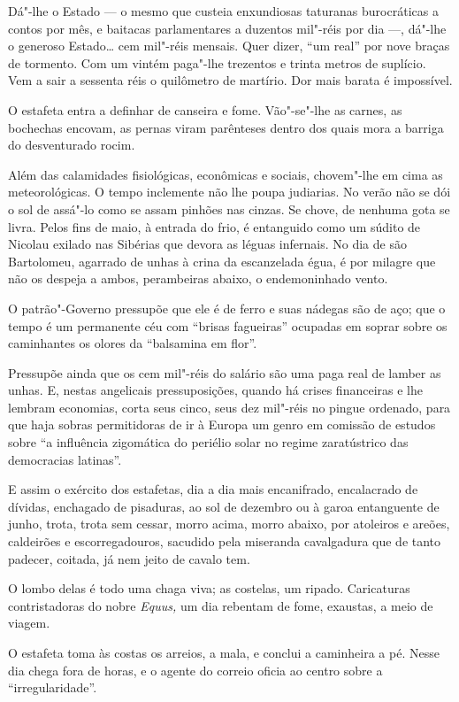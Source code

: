 Dá"-lhe o Estado --- o mesmo que custeia enxundiosas taturanas
burocráticas a contos por mês, e baitacas parlamentares a duzentos
mil"-réis por dia ---, dá"-lhe o generoso Estado\ldots{} cem mil"-réis mensais.
Quer dizer, ``um real'' por nove braças de tormento. Com um vintém
paga"-lhe trezentos e trinta metros de suplício. Vem a sair a sessenta
réis o quilômetro de martírio. Dor mais barata é impossível.

O estafeta entra a definhar de canseira e fome. Vão"-se"-lhe as carnes, as
bochechas encovam, as pernas viram parênteses dentro dos quais mora a
barriga do desventurado rocim.

Além das calamidades fisiológicas, econômicas e sociais, chovem"-lhe em
cima as meteorológicas. O tempo inclemente não lhe poupa judiarias. No
verão não se dói o sol de assá"-lo como se assam pinhões nas cinzas. Se
chove, de nenhuma gota se livra. Pelos fins de maio, à entrada do frio,
é entanguido como um súdito de Nicolau exilado nas Sibérias que devora
as léguas infernais. No dia de são Bartolomeu, agarrado de unhas à crina
da escanzelada égua, é por milagre que não os despeja a ambos,
perambeiras abaixo, o endemoninhado vento.

O patrão"-Governo pressupõe que ele é de ferro e suas nádegas são de aço;
que o tempo é um permanente céu com ``brisas fagueiras'' ocupadas em
soprar sobre os caminhantes os olores da ``balsamina em flor''.

Pressupõe ainda que os cem mil"-réis do salário são uma paga real de
lamber as unhas. E, nestas angelicais pressuposições, quando há crises
financeiras e lhe lembram economias, corta seus cinco, seus dez mil"-réis
no pingue ordenado, para que haja sobras permitidoras de ir à Europa um
genro em
comissão de estudos sobre ``a influência zigomática do periélio solar no
regime zaratústrico das democracias latinas''.

E assim o exército dos estafetas, dia a dia mais encanifrado,
encalacrado de dívidas, enchagado de pisaduras, ao sol de dezembro ou à
garoa entanguente de junho, trota, trota sem cessar, morro acima, morro
abaixo, por atoleiros e areões, caldeirões e escorregadouros, sacudido
pela miseranda cavalgadura que de tanto padecer, coitada, já nem jeito
de cavalo tem.

O lombo delas é todo uma chaga viva; as costelas, um ripado. Caricaturas
contristadoras do nobre \emph{Equus,} um dia rebentam de fome, exaustas,
a meio de viagem.

O estafeta toma às costas os arreios, a mala, e conclui a caminheira a
pé. Nesse dia chega fora de horas, e o agente do correio oficia ao
centro sobre a ``irregularidade''.

